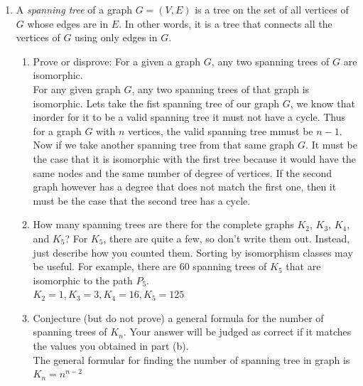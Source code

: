\documentclass[12pt]{article}
\begin{document}
\begin{enumerate}
\begin{enumerate}
\end{enumerate}
\item A \emph{spanning tree} of a graph $G=(V,E)$ is a tree on the set of all vertices of $G$ whose edges are in $E$. In other words, it is a tree that connects all the vertices of $G$ using only edges in $G$.
\begin{enumerate}
\item Prove or disprove: For a given a graph $G$, any two spanning trees of $G$ are isomorphic. \\
    For any given graph $G$, any two spanning trees of that graph is isomorphic. Lets take the fist spanning tree of our graph $G$, we know that inorder for it to be a valid spanning tree it must not have a cycle. Thus for a graph $G$ with $n$ vertices, the valid spanning tree mmust be $n-1$. Now if we take another spanning tree from that same graph $G$. It must be the case that it is isomorphic with the first tree because it would have the same nodes and the same number of degree of vertices. If the second graph however has a degree that does not match the first one, then it must be the case that the second tree has a cycle.
\item How many spanning trees are there for the complete graphs $K_2$, $K_3$, $K_4$, and $K_5$? For $K_5$, there are quite a few, so don't write them out. Instead, just describe how you counted them. Sorting by isomorphism classes may be useful. For example, there are $60$ spanning trees of $K_5$ that are isomorphic to the path $P_5$. \\
    $K_2 = 1, K_3 = 3, K_4 = 16, K_5 = 125$
\item Conjecture (but do not prove) a general formula for the number of spanning trees of $K_n$. Your answer will be judged as correct if it matches the values you obtained in part (b).\\
    The general formular for finding the number of spanning tree in graph is $K_n = n^{n-2}$
\end{enumerate}
\end{enumerate}
\end{document}
